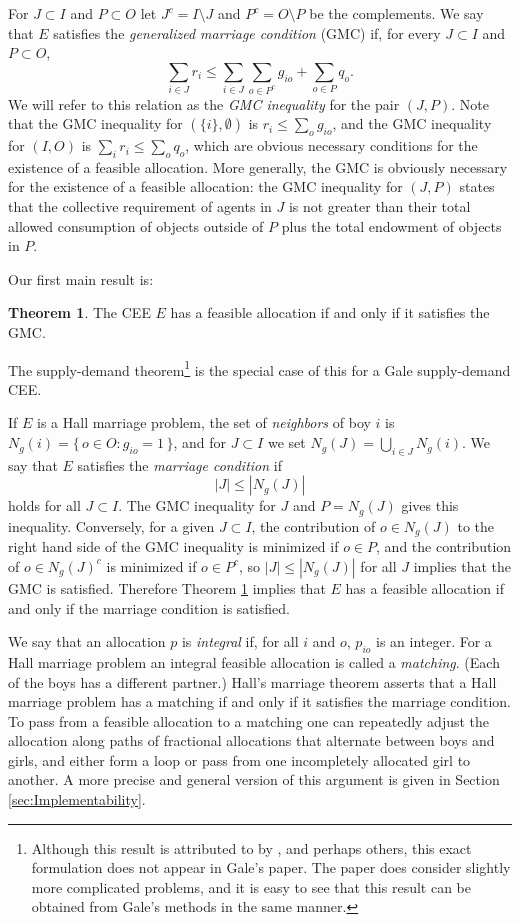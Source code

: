 \documentclass[12pt]{article}
\theoremstyle{definition}
\newtheorem{thm}{Theorem}
\begin{document}
For $J \subset I$ and $P \subset O$ let $J^c = I \setminus J$ and $P^c = O \setminus P$ be the complements.  We say that $E$ satisfies the \emph{generalized marriage condition}
(GMC) if,  for every $J \subset I$ and $P \subset O$,
$$\sum_{i \in J} r_i \le \sum_{i \in J} \sum_{o \in P^c} g_{io} + \sum_{o \in P} q_o.$$  We will refer to this relation as the \emph{GMC inequality} for the pair $(J,P)$.  Note that the GMC inequality for  $(\{i\},\emptyset)$ is  $r_i \le \sum_o g_{io}$,  and the GMC inequality for  $(I,O)$ is  $\sum_i r_i \le \sum_o q_o$, which are obvious necessary conditions  for
the existence of a feasible allocation.  More generally, the GMC is obviously necessary for the existence of a feasible allocation: the GMC inequality for $(J,P)$ states that the collective requirement of agents in $J$ is not greater than their total allowed consumption of objects outside of $P$ plus the total endowment of objects in $P$.

Our first main result is:

\begin{thm} \label{th:MultiHall}
  The CEE $E$ has a feasible allocation if and only if it satisfies the GMC.
\end{thm}

\noindent
The \cite{Gal57} supply-demand theorem\footnote{
Although this result is attributed to \cite{Gal57} by \cite{yilmaz10geb}, and perhaps others, this exact formulation does not appear in Gale's paper.  The paper does consider slightly more complicated problems, and it is easy to see that this result can be obtained from Gale's methods in the same manner.
} is the special case of this for a Gale supply-demand CEE.

If $E$ is a Hall marriage problem, the  set of \emph{neighbors} of boy $i$ is $N_g(i) = \{\, o \in O : g_{io} = 1
\,\}$, and for $J \subset I$ we set $N_g(J) = \bigcup_{i \in J}
N_g(i)$.  We say that $E$ satisfies the   \emph{marriage condition} if $$|J| \le |N_g(J)|$$ holds for all $J \subset I$.  
The GMC inequality for $J$ and $P = N_g(J)$ gives this inequality.  Conversely, for a
given $J \subset I$, the contribution of $o \in N_g(J)$ to the right
hand side of the GMC inequality is minimized if $o \in P$, and the
contribution of $o \in N_g(J)^c$ is minimized if $o \in
P^c$, so $|J| \le |N_g(J)|$ for all $J$ implies that the GMC is
satisfied.  Therefore Theorem \ref{th:MultiHall} implies that $E$ has a feasible allocation if and only if the marriage condition is satisfied.

We say that an allocation $p$ is \emph{integral} if, for all $i$ and $o$, $p_{io}$ is an integer. For a Hall marriage problem an integral feasible allocation is called a \emph{matching}.  (Each of the boys has a different partner.)  Hall's marriage theorem asserts that a Hall marriage problem has a matching if
and only if it satisfies the marriage condition.  
To pass from a feasible allocation to a matching one can repeatedly adjust the allocation along paths of fractional allocations that alternate between boys and girls, and either form a loop or pass from one incompletely allocated girl to another.  A more precise and general version of this argument is given in  Section \ref{sec:Implementability}.
\end{document}
